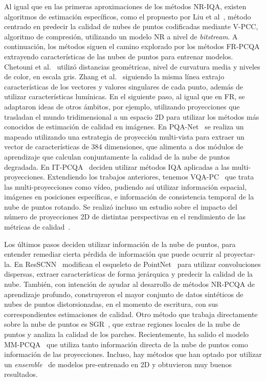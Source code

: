 Al igual que en las primeras aproximaciones de los métodos NR-IQA, existen 
algoritmos de estimación específicos, como el propuesto por Liu et al~\cite{bitstreamPCQ},
método centrado en predecir la calidad de nubes de puntos 
codificadas mediante V-PCC, algoritmo de compresión, utilizando un modelo NR 
a nivel de \emph{bitstream}. A continuación, los métodos siguen el camino explorado 
por los métodos FR-PCQA extrayendo características de las nubes de puntos para 
entrenar modelos.  Chetouni et al.~\cite{NR-CNN-3D-PC} utilizó distancias geométricas, nivel de curvatura media
y niveles de color, en escala gris. Zhang et al.~\cite{NR3DQA} siguiendo la misma 
línea extrajo características de los vectores y valores singulares de cada punto,
además de utilizar características lumínicas.
En el siguiente paso, al igual que en FR, se adaptaron ideas de otros ámbitos, por ejemplo, utilizando 
proyecciones que trasladan el mundo tridimensional a un espacio 2D para utilizar 
los métodos más conocidos de estimación de calidad en imágenes.
En PQA-Net~\cite{PQA-Net} se realiza un mapeado 
utilizando una estrategia de proyección multi-vista para extraer un vector de 
características de 384 dimensiones, que alimenta a dos módulos de aprendizaje 
que calculan conjuntamente la calidad de la nube de puntos degradada. 
En IT-PCQA~\cite{IT-PCQA} deciden utilizar métodos IQA aplicadas a las multi-proyecciones.
Extendiendo los trabajos anteriores, tenemos VQA-PC~\cite{VQA-PC} que trata las 
multi-proyecciones como vídeo, pudiendo así utilizar información espacial, 
imágenes en posiciones específicas, e información de consistencia temporal 
de la nube de puntos rotando. 
Se realizó incluso un estudio sobre el impacto del número de proyecciones 2D de 
distintas perspectivas en el rendimiento de las métricas de calidad~\cite{ImpactOf2DProyections, IT-PCQA}.

Los últimos pasos deciden utilizar información de la nube de puntos, para 
entender remediar cierta pérdida de información que puede ocurrir al proyectar-la. 
En ResSCNN~\cite{ResSCNN} modifican el esqueleto de PointNet~\cite{PointNet} para 
utilizar convoluciones dispersas, extraer características de forma jerárquica y 
predecir la calidad de la nube. También, con intención de ayudar al desarrollo 
de métodos NR-PCQA de aprendizaje profundo, construyeron el mayor conjunto de datos sintéticos
de nubes de puntos distorsionadas, en el momento de escritura, con sus correspondientes estimaciones de calidad. 
Otro método que trabaja directamente sobre la nube de puntos es SGR~\cite{SGR}, 
que extrae regiones locales de la nube de puntos y analiza la calidad de los parches.
Recientemente, ha salido el modelo MM-PCQA~\cite{MM-PCQA} que utiliza tanto información 
directa de la nube de puntos como información de las proyecciones. Incluso, hay 
métodos que han optado por utilizar un \emph{ensemble}~\cite{EnsemblePCQA} de 
modelos pre-entrenado en 2D y obtuvieron muy buenos resultados. 

